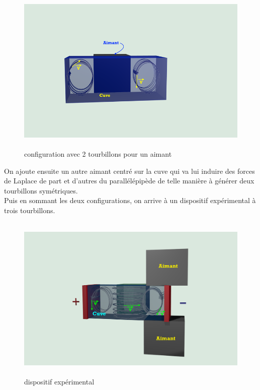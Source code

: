 \documentclass[a4paper,12pt,titlepage]{report}
\begin{document}
\begin{onehalfspace}
\begin{figure}[!h]
	\begin{center}
	\centering
		\includegraphics[height = 8cm, keepaspectratio]{graphes/config_centre.png} 
		\caption{configuration avec 2 tourbillons pour un aimant}
	\end{center}
\end{figure}
On ajoute ensuite un autre aimant centré sur la cuve qui va lui induire des forces de Laplace de part et d'autres du parallélépipède de telle manière à générer deux tourbillons symétriques.\\
Puis en sommant les deux configurations, on arrive à un dispositif expérimental à trois tourbillons. \\
\begin{figure}[!h]
	\begin{center}
	\centering
		\includegraphics[height = 8cm, keepaspectratio]{graphes/blender_cuve_champvec3.png} 
		\caption{dispositif expérimental}
	\end{center}
\end{figure}
\\
\newpage
\newpage

\end{onehalfspace}
\end{document}

